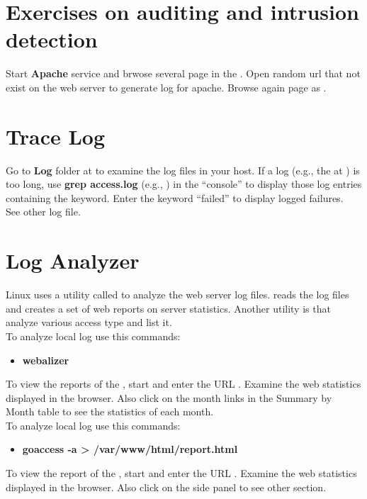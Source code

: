 \documentclass{../UTNetLab}
\begin{document}
\section*{Exercises on auditing and intrusion detection}
	Start \textbf{Apache} service and brwose several page in the . Open random url that not exist on the web server to generate log for apache. Browse again page as .

\section{Trace Log}
	Go to \textbf{Log} folder at  to examine the log files in your host. If a log (e.g., the  at ) is too long, use \textbf{grep  access.log} (e.g., ) in the “console” to display those log entries containing the keyword. Enter the keyword “failed” to display logged failures.\\
	See other log file.

\section{Log Analyzer}
	Linux uses a utility called  to analyze the web server log files.  reads the  log files and creates a set of web reports on server statistics. Another utility is  that analyze various access type and list it.\\
	To analyze local log use this commands:
	\begin{itemize}
		\item \textbf{webalizer}
	\end{itemize}
	To view the reports of the , start  and enter the URL . Examine the web statistics displayed in the browser. Also click on the month links in the Summary by Month table to see the statistics of each month.\\
	To analyze local log use this commands:
	\begin{itemize}
		\item \textbf{goaccess -a > /var/www/html/report.html}
	\end{itemize}
	To view the report of the , start  and enter the URL . Examine the web statistics displayed in the browser. Also click on the side panel to see other section.
\end{document}
